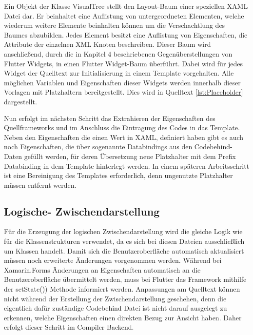 Ein Objekt der Klasse VisualTree stellt den Layout-Baum einer speziellen XAML Datei dar.  Er beinhaltet eine Auflistung von untergeordneten Elementen, welche wiederum weitere Elemente beinhalten können um die Verschachtlung des Baumes abzubilden.  Jedes Element besitzt eine Auflistung von Eigenschaften, die Attribute der einzelnen XML Knoten beschreiben.  Dieser Baum wird anschließend,  durch die in Kapitel 4 beschriebenen Gegenüberstellungen von Flutter Widgets, in einen Flutter Widget-Baum überführt.  Dabei wird für jedes Widget der Quelltext zur Initialisierung in einem Template vorgehalten.  Alle möglichen Variablen und Eigenschaften dieser Widgets werden innerhalb dieser Vorlagen mit Platzhaltern bereitgestellt.  Dies wird in Quelltext \ref{lst:Placeholder} dargestellt.

 

Nun erfolgt im nächsten Schritt das Extrahieren der Eigenschaften des Quellframeworks und im 
Anschluss die Eintragung des Codes in das Template.  Neben den Eigenschaften die einen Wert in XAML,  definiert haben gibt es auch noch Eigenschaften,  die über sogenannte Databindings aus den Codebehind-Daten gefüllt werden,  für deren Übersetzung neue Platzhalter mit dem Prefix Databinding in dem Template hinterlegt 
werden. In einem späteren Arbeitsschritt ist eine Bereinigung des Templates erforderlich,  denn ungenutzte Platzhalter müssen entfernt werden.



\subsection{Logische- Zwischendarstellung}

Für die Erzeugung der logischen Zwischendarstellung wird die gleiche Logik wie für die Klassenstrukturen verwendet,  da es sich bei diesen Dateien ausschließlich um \Csharp Klassen handelt.  Damit sich die Benutzeroberfläche automatisch aktualisiert müssen noch erweiterte Änderungen vorgenommen werden.
Während bei Xamarin.Forms Änderungen an Eigenschaften automatisch an die Benutzeroberfläche 
übermittelt werden, muss bei Flutter das Framework mithilfe der setState()) Methode  informiert 
werden.  Anpassungen am Quelltext können nicht während der Erstellung der Zwischendarstellung 
geschehen, denn die eigentlich dafür zuständige Codebehind Datei ist nicht darauf ausgelegt zu 
erkennen, welche Eigenschaften einen direkten Bezug zur Ansicht haben.  Daher erfolgt dieser Schritt im Compiler Backend.

